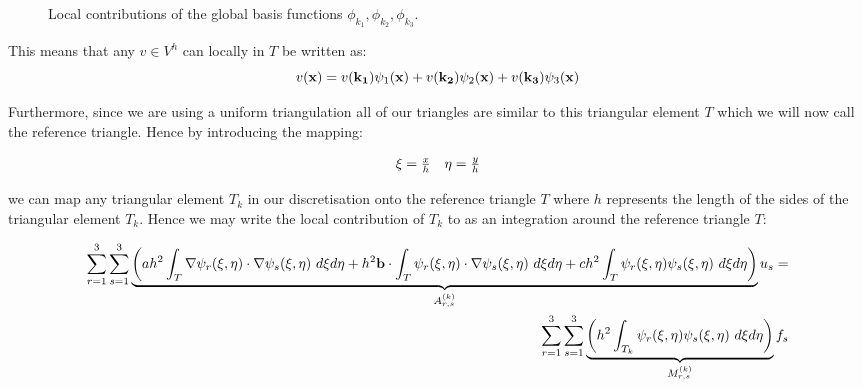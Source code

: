\begin{figure}
\centering
\begin{subfigure}[b]{0.30\textwidth}
    \centering
    \resizebox{\linewidth}{!}{}
\end{subfigure}
\begin{subfigure}[b]{0.30\textwidth}
    \centering
    \resizebox{\linewidth}{!}{}
\end{subfigure}
\begin{subfigure}[b]{0.30\textwidth}
    \centering
    \resizebox{\linewidth}{!}{}
\end{subfigure}
\caption{Local contributions of the global basis functions
         $\phi_{k_1}, \phi_{k_2}, \phi_{k_3}$.}
\label{fig:twod-local-basis}
\end{figure}

This means that any $v \in V^h$ can locally in $T$ be written as:
\[
    v(\mathbf{x}) = v(\mathbf{k_1})\psi_1(\mathbf{x}) + v(\mathbf{k_2})\psi_2(\mathbf{x}) + v(\mathbf{k_3})\psi_3(\mathbf{x})
\]

Furthermore, since we are using a uniform triangulation all of our triangles
are similar to this triangular element $T$ which we will now call the reference
triangle. Hence by introducing the mapping:

\begin{align*}
 \begin{array}{c c}
    \xi = \frac{x}{h} & \eta = \frac{y}{h}
 \end{array}
\end{align*}

we can map any triangular element $T_k$ in our discretisation onto the
reference triangle $T$ where $h$ represents the length of the sides of the
triangular element $T_k$. Hence we may write the local contribution of $T_k$ to
 as an integration around the reference
triangle $T$:

\begin{align}\label{eq:twod-deterministic-discrete-local}
    \begin{split}
    \sum_{r=1}^3\sum_{s=1}^3\underbrace{
      \left(
        ah^2\int_{T}\nabla\psi_r(\xi, \eta)\cdot\nabla\psi_s(\xi, \eta)\ d\xi d\eta
        + h^2\v{b} \cdot \int_{T}\psi_r(\xi,\eta)\cdot\nabla\psi_s(\xi,\eta)\ d\xi d\eta
        + ch^2\int_{T}\psi_r(\xi,\eta)\psi_s(\xi,\eta)\ d\xi d\eta
      \right)}_{A^{(k)}_{r,s}}u_s = \\
    \sum_{r=1}^3\sum_{s=1}^3\underbrace{\left(
        h^2\int_{T_k}\psi_r(\xi,\eta)\psi_s(\xi,\eta)\ d\xi d\eta
    \right)}_{M^{(k)}_{r,s}}f_s
    \end{split}
\end{align}

